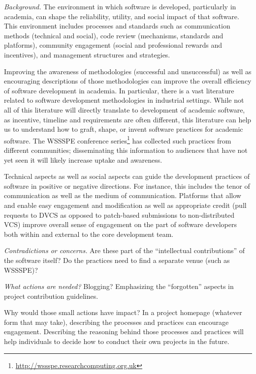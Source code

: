 

\emph{Background.} The environment in which software is developed, particularly in academia, can shape the reliability, utility, and social impact of that software.  This environment includes processes and standards such as communication methods (technical and social), code review (mechanisms, standards and platforms), community engagement (social and professional rewards and incentives), and management structures and strategies.

Improving the awareness of methodologies (successful and unsuccessful) as well as encouraging descriptions of those methodologies can improve the overall efficiency of software development in academia.  In particular, there is a vast literature related to software development methodologies in industrial settings. While not all of this literature will directly translate to development of academic software, as incentive, timeline and requirements are often different, this literature can help us to understand how to graft, shape, or invent software practices for academic software.
The WSSSPE conference series\footnote{\url{http://wssspe.researchcomputing.org.uk}} has collected such practices from different communities; disseminating this information to audiences that have not yet seen it will likely increase uptake and awareness.

Technical aspects as well as social aspects can guide the development practices of software in positive or negative directions.  For instance, this includes the tenor of communication as well as the medium of communication.  Platforms that allow and enable easy engagement and modification as well as appropriate credit (\ie pull requests to DVCS as opposed to patch-based submissions to non-distributed VCS) improve overall sense of engagement on the part of software developers both within and external to the core development team.

\emph{Contradictions or concerns.} Are these part of the ``intellectual contributions'' of the software itself?  Do the practices need to find a separate venue (such as WSSSPE)?

\emph{What actions are needed?} Blogging? Emphasizing the ``forgotten'' aspects in project contribution guidelines.

Why would those small actions have impact?
In a project homepage (whatever form that may take), describing the processes and practices can encourage engagement.  Describing the reasoning behind those processes and practices will help individuals to decide how to conduct their own projects in the future.  

